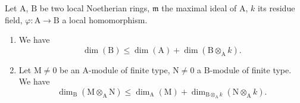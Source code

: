 \begin{proposition}[16.3.9]
\label{0.16.3.9}
Let $\mathrm{A}$, $\mathrm{B}$ be two local Noetherian rings, $\mathfrak{m}$ the maximal ideal of $\mathrm{A}$, $k$ its residue field, $\varphi:\mathrm{A}\to\mathrm{B}$ a local homomorphism.
\begin{enumerate}
  \item[\rm{(i)}] We have
  \begin{equation}
  \label{0.16.3.9.1}
  \tag{16.3.9.1}
    \dim(\mathrm{B})\leq\dim(\mathrm{A})+\dim(\mathrm{B}\otimes_\mathrm{A}k).
  \end{equation}
  \item[\rm{(ii)}] Let $\mathrm{M}\neq 0$ be an $\mathrm{A}$-module of finite type, $\mathrm{N}\neq 0$ a $\mathrm{B}$-module of finite type.
  We have
  \begin{equation}
  \label{0.16.3.9.2}
  \tag{16.3.9.2}
    \dim_\mathrm{B}(\mathrm{M}\otimes_\mathrm{A}\mathrm{N})\leq\dim_\mathrm{A}(\mathrm{M})+\dim_{\mathrm{B}\otimes_\mathrm{A}k}(\mathrm{N}\otimes_\mathrm{A}k).
  \end{equation}
\end{enumerate}
\end{proposition}

